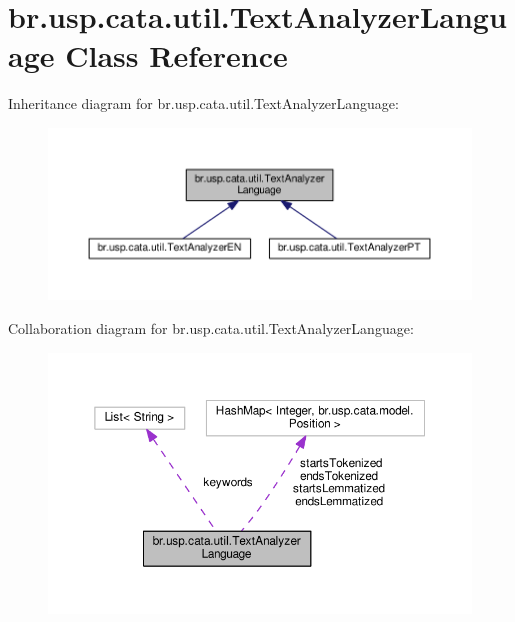 \hypertarget{classbr_1_1usp_1_1cata_1_1util_1_1_text_analyzer_language}{\section{br.\+usp.\+cata.\+util.\+Text\+Analyzer\+Language Class Reference}
\label{classbr_1_1usp_1_1cata_1_1util_1_1_text_analyzer_language}
}


Inheritance diagram for br.\+usp.\+cata.\+util.\+Text\+Analyzer\+Language\+:\nopagebreak
\begin{figure}[H]
\begin{center}
\leavevmode
\includegraphics[width=350pt]{classbr_1_1usp_1_1cata_1_1util_1_1_text_analyzer_language__inherit__graph}
\end{center}
\end{figure}


Collaboration diagram for br.\+usp.\+cata.\+util.\+Text\+Analyzer\+Language\+:\nopagebreak
\begin{figure}[H]
\begin{center}
\leavevmode
\includegraphics[width=350pt]{classbr_1_1usp_1_1cata_1_1util_1_1_text_analyzer_language__coll__graph}
\end{center}
\end{figure}
